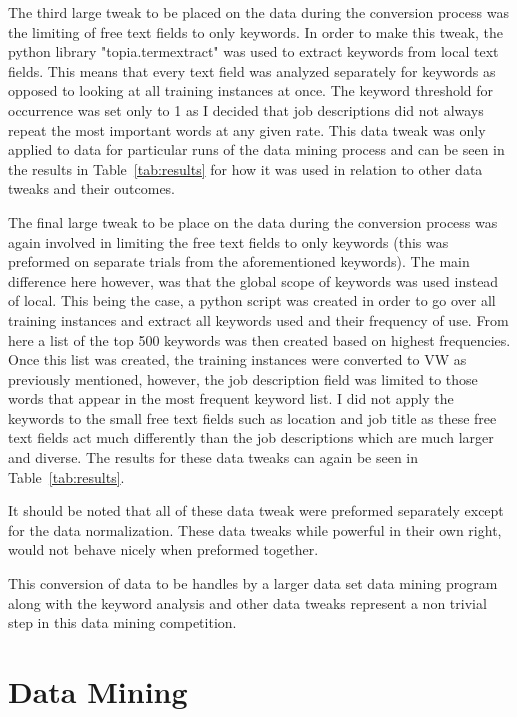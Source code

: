 \documentclass[conference]{IEEEtran}
\begin{document}
The third large tweak to be placed on the data during the conversion process
was the limiting of free text ﬁelds to only keywords. In order to make this tweak,
the python library "topia.termextract" was used to extract keywords from local text 
fields. This means that every text field was analyzed separately for
keywords as opposed to looking at all training instances at once. The keyword
threshold for occurrence was set only to 1 as I decided that job descriptions
did not always repeat the most important words at any given rate. This data
tweak was only applied to data for particular runs of the data mining process
and can be seen in the results in Table~\ref{tab:results} for how it was used in relation to
other data tweaks and their outcomes.

The final large tweak to be place on the data during the conversion process
was again involved in limiting the free text fields to only keywords (this was
preformed on separate trials from the aforementioned keywords). The main difference 
here however, was that the global scope of keywords was used instead
of local. This being the case, a python script was created in order to go over
all training instances and extract all keywords used and their frequency of use.
From here a list of the top 500 keywords was then created based on highest
frequencies. Once this list was created, the training instances were converted to
VW as previously mentioned, however, the job description field was limited to
those words that appear in the most frequent keyword list. I did not apply the
keywords to the small free text fields such as location and job title as these free
text fields act much differently than the job descriptions which are much larger
and diverse. The results for these data tweaks can again be seen in Table~\ref{tab:results}.

It should be noted that all of these data tweak were preformed separately except 
for the data normalization. These data tweaks while powerful in their own
right, would not behave nicely when preformed together.

This conversion of data to be handles by a larger data set data mining program
along with the keyword analysis and other data tweaks represent a non trivial
step in this data mining competition.

\section{Data Mining}
\end{document}
